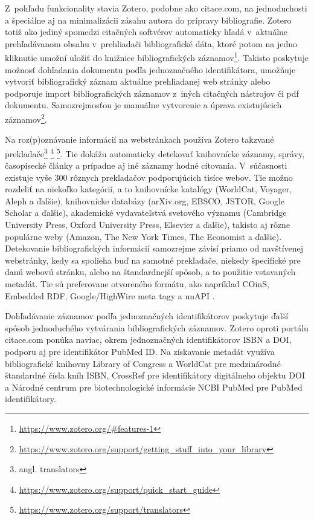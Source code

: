 \documentclass{fithesis3}
\begin{document}
	Z~pohľadu funkcionality stavia Zotero, podobne ako citace.com, na jednoduchosti a špeciálne aj na minimalizácii zásahu autora do prípravy bibliografie. Zotero totiž ako jediný spomedzi citačných softvérov automaticky hľadá v~aktuálne prehľadávanom obsahu v~prehliadači bibliografické dáta, ktoré potom na jedno kliknutie umožní uložiť do knižnice bibliografických záznamov\footnote{\url{https://www.zotero.org/\#features-1}}. Takisto poskytuje možnosť dohľadania dokumentu podľa jednoznačného identifikátora, umožňuje vytvoriť bibliografický záznam aktuálne prehliadanej web stránky alebo podporuje import bibliografických záznamov z~iných citačných nástrojov či pdf dokumentu. Samozrejmosťou je manuálne vytvorenie a úprava existujúcich záznamov\footnote{\url{https://www.zotero.org/support/getting_stuff_into_your_library}}.
	
	Na roz(p)oznávanie informácií na webstránkach používa Zotero takzvané prekladače\footnote{angl. translators} \footnote{\url{https://www.zotero.org/support/quick_start_guide}} \footnote{\url{https://www.zotero.org/support/translators}}. Tie dokážu automaticky detekovať knihovnícke záznamy, správy, časopisecké články a prípadne aj iné záznamy hodné citovania. V~súčasnosti existuje vyše 300 rôznych prekladačov podporujúcich tisíce webov. Tie možno rozdeliť na niekoľko kategórií, a to knihovnícke katalógy (WorldCat, Voyager, Aleph a ďalšie), knihovnícke databázy (arXiv.org, EBSCO, JSTOR, Google Scholar a ďalšie), akademické vydavateľstvá svetového významu (Cambridge University Press, Oxford University Press, Elsevier a ďalšie), takisto aj rôzne populárne weby (Amazon, The New York Times, The Economist a ďalšie). Detekovanie bibliografických informácií samozrejme závisí priamo od navštívenej webstránky, kedy sa spolieha buď na samotné prekladače, niekedy špecifické pre danú webovú stránku, alebo na štandardnejší spôsob, a to použitie vstavaných metadát. Tie sú preferovane otvoreného formátu, ako napríklad COinS, Embedded RDF, Google/HighWire meta tagy a unAPI \cite{ZoteroTranslators}.
	
	Dohľadávanie záznamov podľa jednoznačných identifikátorov poskytuje ďalší spôsob jednoduchého vytvárania bibliografických záznamov. Zotero oproti portálu citace.com ponúka naviac, okrem jednoznačných identifikátorov ISBN a DOI, podporu aj pre identifikátor PubMed ID. Na získavanie metadát využíva bibliografické knihovny Library of Congress a WorldCat pre medzinárodné štandardné čísla kníh ISBN, CrossRef pre identifikátory digitálneho objektu DOI a Národné centrum pre biotechnologické informácie NCBI PubMed pre PubMed identifikátory.
	
\end{document}
